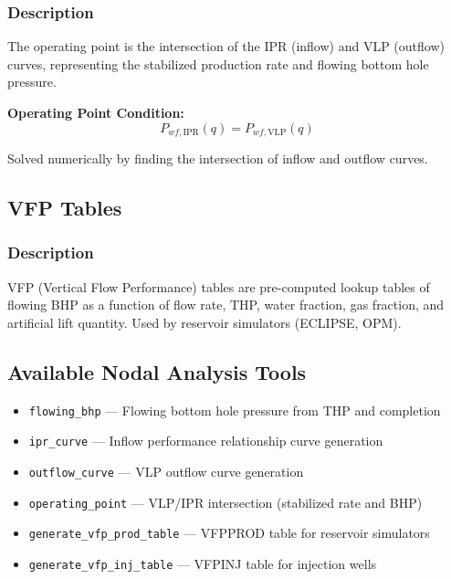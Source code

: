 \documentclass[11pt,a4paper]{article}
\begin{document}
\subsubsection{Description}
The operating point is the intersection of the IPR (inflow) and VLP (outflow) curves, representing the stabilized production rate and flowing bottom hole pressure.

\begin{tcolorbox}[colback=formulabox,colframe=black!75]
\textbf{Operating Point Condition:}
\begin{equation}
P_{wf,\text{IPR}}(q) = P_{wf,\text{VLP}}(q)
\end{equation}

Solved numerically by finding the intersection of inflow and outflow curves.
\end{tcolorbox}

\subsection{VFP Tables}

\subsubsection{Description}
VFP (Vertical Flow Performance) tables are pre-computed lookup tables of flowing BHP as a function of flow rate, THP, water fraction, gas fraction, and artificial lift quantity. Used by reservoir simulators (ECLIPSE, OPM).

\subsection{Available Nodal Analysis Tools}
\begin{itemize}
\item \texttt{flowing\_bhp} --- Flowing bottom hole pressure from THP and completion
\item \texttt{ipr\_curve} --- Inflow performance relationship curve generation
\item \texttt{outflow\_curve} --- VLP outflow curve generation
\item \texttt{operating\_point} --- VLP/IPR intersection (stabilized rate and BHP)
\item \texttt{generate\_vfp\_prod\_table} --- VFPPROD table for reservoir simulators
\item \texttt{generate\_vfp\_inj\_table} --- VFPINJ table for injection wells
\end{itemize}
\end{document}
